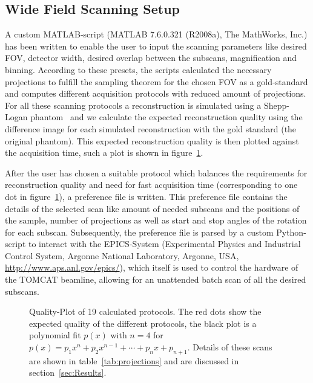 \subsection{Wide Field Scanning Setup}
\label{subsec:wfs-setup}%
\cbstart
A custom MATLAB-script (MATLAB\textsuperscript{\textregistered} 7.6.0.321 (R2008a), The MathWorks, Inc.) has been written to enable the user to input the scanning parameters like desired FOV, detector width, desired overlap between the subscans, magnification and binning. According to these presets, the scripts calculated the necessary projections to fulfill the sampling theorem for the chosen FOV as a gold-standard and computes different acquisition protocols with reduced amount of projections. For all these scanning protocols a reconstruction is simulated using a Shepp-Logan phantom~\cite{Shepp1974} and we calculate the expected reconstruction quality using the difference image for each simulated reconstruction with the gold standard (the original phantom). This expected reconstruction quality is then plotted against the acquisition time, such a plot is shown in figure~\ref{fig:qualityplot}.

After the user has chosen a suitable protocol which balances the requirements for reconstruction quality and need for fast acquisition time (corresponding to one dot in figure~\ref{fig:qualityplot}), a preference file is written. This preference file contains the details of the selected scan like amount of needed subscans and the positions of the sample, number of projections as well as start and stop angles of the rotation for each subscan. Subsequently, the preference file is parsed by a custom Python-script to interact with the EPICS-System (Experimental Physics and Industrial Control System, Argonne National Laboratory, Argonne, USA, \url{http://www.aps.anl.gov/epics/}), which itself is used to control the hardware of the TOMCAT beamline, allowing for an unattended batch scan of all the desired subscans.
\cbend

\begin{figure}[htp]
	\centering
	\caption{Quality-Plot of 19 calculated protocols. The red dots show the expected quality of the different protocols, the black plot is a polynomial fit $p(x)$ with $n=4$ for $p(x)=p_{1}x^{n}+p_{2}x^{n-1}+\cdots+p_{n}x+p_{n+1}$. Details of these scans are shown in table~\ref{tab:projections} and are discussed in section~\ref{sec:Results}.}%
	\label{fig:qualityplot}%
\end{figure}

